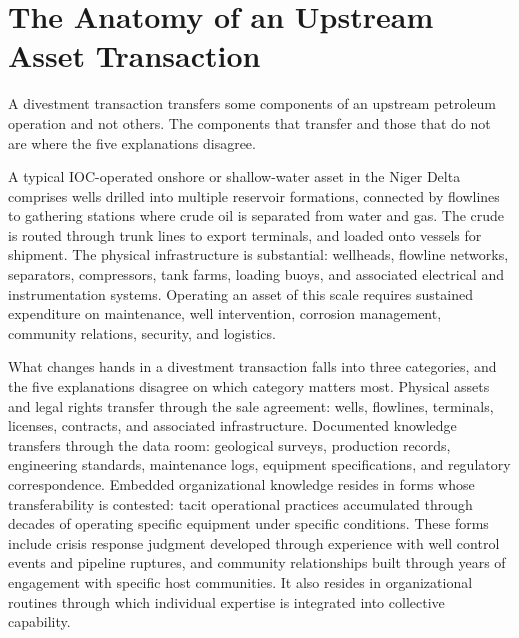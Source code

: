 \hypertarget{the-anatomy-of-an-upstream-asset-transaction}{%
\section{The Anatomy of an Upstream Asset
Transaction}\label{the-anatomy-of-an-upstream-asset-transaction}}

A divestment transaction transfers some components of an upstream
petroleum operation and not others. The components that transfer and
those that do not are where the five explanations disagree.

A typical IOC-operated onshore or shallow-water asset in the Niger Delta
comprises wells drilled into multiple reservoir formations, connected by
flowlines to gathering stations where crude oil is separated from water
and gas. The crude is routed through trunk lines to export terminals,
and loaded onto vessels for shipment. The physical infrastructure is
substantial: wellheads, flowline networks, separators, compressors, tank
farms, loading buoys, and associated electrical and instrumentation
systems. Operating an asset of this scale requires sustained expenditure
on maintenance, well intervention, corrosion management, community
relations, security, and logistics.

What changes hands in a divestment transaction falls into three
categories, and the five explanations disagree on which category matters
most. Physical assets and legal rights transfer through the sale
agreement: wells, flowlines, terminals, licenses, contracts, and
associated infrastructure. Documented knowledge transfers through the
data room: geological surveys, production records, engineering
standards, maintenance logs, equipment specifications, and regulatory
correspondence. Embedded organizational knowledge resides in forms whose
transferability is contested: tacit operational practices accumulated
through decades of operating specific equipment under specific
conditions. These forms include crisis response judgment developed
through experience with well control events and pipeline ruptures, and
community relationships built through years of engagement with specific
host communities. It also resides in organizational routines through
which individual expertise is integrated into collective capability.


